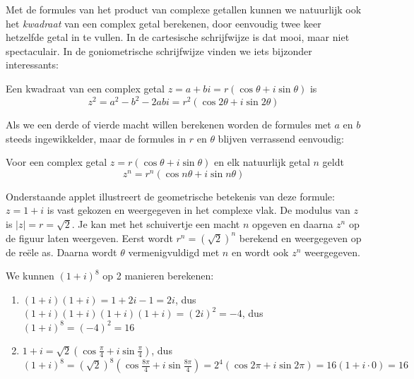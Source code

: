 \documentclass{ximera}
\begin{document}
	\author{Zomercursus KU Leuven}
	
	\label{xim:complexe_getallen_demoivre}

Met de formules van het product van complexe getallen kunnen we natuurlijk ook het \textit{kwadraat} van een complex getal berekenen, door eenvoudig twee keer hetzelfde getal in te vullen. In de cartesische schrijfwijze is dat mooi, maar niet spectaculair. In de goniometrische schrijfwijze vinden we iets bijzonder interessants:

Een kwadraat van een complex getal $z=a+bi = r (\cos \theta + i \sin \theta )$ is
$$
z^2 = a^2 - b^2 -2abi = r^2(\cos 2\theta + i \sin 2\theta )
$$

Als we een derde of vierde macht willen berekenen worden de formules met $a$ en $b$ steeds ingewikkelder, maar de formules in $r$ en $\theta$ blijven verrassend eenvoudig:

\begin{proposition}\nl
	
Voor een complex getal $z= r (\cos \theta + i \sin \theta )$ en elk natuurlijk getal $n$ geldt
$$
z^n = r^n(\cos n\theta + i \sin n\theta )
$$
\end{proposition}

\begin{basicSkip}
Onderstaande applet illustreert de geometrische betekenis van deze formule: $z=1+i$ is vast gekozen en weergegeven in het complexe vlak. De modulus van $z$ is $|z|=r=\sqrt{2}$. Je kan met het schuivertje een macht $n$ opgeven en daarna $z^n$ op de figuur laten weergeven. Eerst wordt $r^n= (\sqrt{2})^n$ berekend en weergegeven op de reële as. Daarna wordt $\theta$ vermenigvuldigd met $n$ en wordt ook $z^n$ weergegeven.

\end{basicSkip}

\begin{example}
	We kunnen $(1+i)^8$ op 2 manieren berekenen:
			
		\begin{enumerate}
			\item $(1+i)(1+i)=1+2i-1=2i$, dus $(1+i)(1+i)(1+i)(1+i)=(2i)^2=-4$, dus $(1+i)^8=(-4)^2=16$
			\item $1+i=\sqrt{2}(\cos \frac{\pi}{4}+i\sin\frac{\pi}{4})$, dus $(1+i)^8=(\sqrt{2})^8(\cos  \frac{8\pi}{4}+i\sin \frac{8\pi}{4})=2^4(\cos 2\pi +i \sin 2\pi)=16(1+i\cdot 0)=16$
		\end{enumerate}
		
	\end{example}
\end{document}
